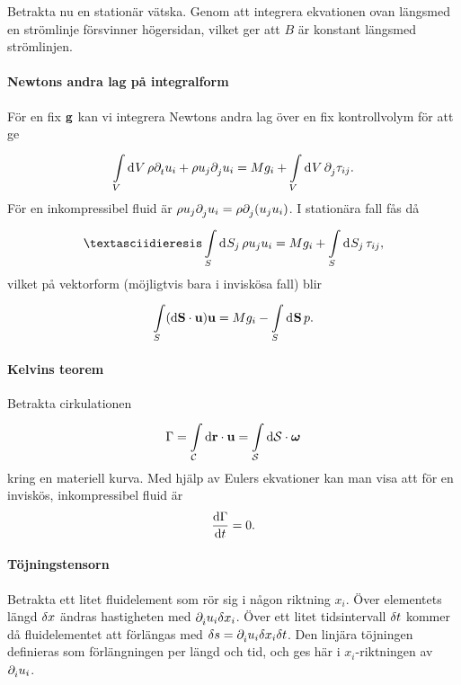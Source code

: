Betrakta nu en stationär vätska. Genom att integrera ekvationen ovan längsmed en strömlinje försvinner högersidan, vilket ger att $B$ är konstant längsmed strömlinjen.

\paragraph{Newtons andra lag på integralform}
För en fix $\vb{g}$ kan vi integrera Newtons andra lag över en fix kontrollvolym för att ge
\begin{align*}
	\int\limits_{V}^{}\dd[]{V}\rho\partial_{t}^{}u_{i} + \rho u_{j}\partial_{j}^{}u_{i} = Mg_{i} + \int\limits_{V}^{}\dd[]{V}\partial_{j}^{}\tau_{ij}.
\end{align*}
För en inkompressibel fluid är $\rho u_{j}\partial_{j}^{}u_{i} = \rho \partial_{j}^{}(u_{j}u_{i})$. I stationära fall fås då
\begin{align*}
¨	\integ{S}{}{S_{j}}{\rho u_{j}u_{i}} = Mg_{i} + \integ{S}{}{S_{j}}{\tau_{ij}},
\end{align*}
vilket på vektorform (möjligtvis bara i inviskösa fall) blir
\begin{align*}
	\int\limits_{S}(\dd{\vb{S}}\cdot\vb{u})\vb{u} = Mg_{i} - \int\limits_{S}^{}\dd[]{\vb{S}}p.
\end{align*}

\paragraph{Kelvins teorem}
Betrakta cirkulationen
\begin{align*}
	\Gamma = \int\limits_{\mathcal{C}}^{}\dd{\vb{r}}\cdot \vb{u} = \int\limits_{\mathcal{S}}^{}\dd{\vb{\mathcal{S}}}\cdot \vb*{\omega}
\end{align*}
kring en materiell kurva. Med hjälp av Eulers ekvationer kan man visa att för en inviskös, inkompressibel fluid är
\begin{align*}
	\dv{\Gamma}{t} = 0.
\end{align*}

\paragraph{Töjningstensorn}
Betrakta ett litet fluidelement som rör sig i någon riktning $x_{i}$. Över elementets längd $\delta x$ ändras hastigheten med $\partial_{i}^{}u_{i}\delta x_{i}$. Över ett litet tidsintervall $\delta t$ kommer då fluidelementet att förlängas med $\delta s = \partial_{i}^{}u_{i}\delta x_{i}\delta t$. Den linjära töjningen definieras som förlängningen per längd och tid, och ges här i $x_{i}$-riktningen av $\partial_{i}^{}u_{i}$.

